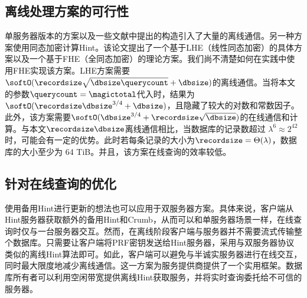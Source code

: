 \subsection{离线处理方案的可行性}
单服务器版本的方案以及一些文献\cite{Piano, EC:CorHenKog22}中提出的构造引入了大量的离线通信。另一种方案\cite{EC:CorHenKog22}使用同态加密计算Hint。该论文提出了一个基于LHE（线性同态加密）的具体方案以及一个基于FHE（全同态加密）的理论方案。我们尚不清楚如何在实践中使用FHE实现该方案。LHE方案需要$\softO(\recordsize\sqrt{\dbsize \querycount} + \dbsize)$的离线通信。当将本文的参数$\querycount=\magictotal$代入时，结果为$\softO(\recordsize\dbsize^{3/4} + \dbsize)$，且隐藏了较大的对数和常数因子。此外，该方案需要$\softO(\dbsize^{3/4}+\recordsize\sqrt{\dbsize})$的在线通信和计算。与本文$\recordsize\dbsize$离线通信相比，当数据库的记录数超过 $\lambda^6 \approx 2^{42}$ 时，可能会有一定的优势。此时若每条记录的大小为$\recordsize = \Theta(\lambda)$，数据库的大小至少为 64 TiB。并且，该方案在线查询的效率较低。

\subsection{针对在线查询的优化}
\label{sec:optimized-model}
使用备用Hint进行更新的想法也可以应用于双服务器方案。具体来说，客户端从Hint服务器获取额外的备用Hint和Crumb，从而可以和单服务器场景一样，在线查询时仅与一台服务器交互。然而，在离线阶段客户端与服务器并不需要流式传输整个数据库。只需要让客户端将PRF密钥发送给Hint服务器，采用与双服务器协议类似的离线Hint算法即可。如此，客户端可以避免与半诚实服务器进行在线交互，同时最大限度地减少离线通信。这一方案为服务提供商提供了一个实用框架。数据库所有者可以利用空闲带宽提供离线Hint获取服务，并将实时查询委托给不可信的服务器。
